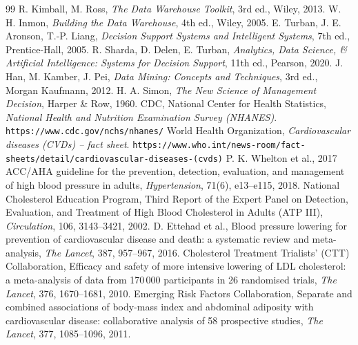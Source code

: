 \begin{thebibliography}{99}
 R. Kimball, M. Ross, \emph{The Data Warehouse Toolkit}, 3rd ed., Wiley, 2013.
 W. H. Inmon, \emph{Building the Data Warehouse}, 4th ed., Wiley, 2005.
 E. Turban, J. E. Aronson, T.-P. Liang, \emph{Decision Support Systems and Intelligent Systems}, 7th ed., Prentice-Hall, 2005.
 R. Sharda, D. Delen, E. Turban, \emph{Analytics, Data Science, \& Artificial Intelligence: Systems for Decision Support}, 11th ed., Pearson, 2020.
 J. Han, M. Kamber, J. Pei, \emph{Data Mining: Concepts and Techniques}, 3rd ed., Morgan Kaufmann, 2012.
 H. A. Simon, \emph{The New Science of Management Decision}, Harper \& Row, 1960.
 CDC, National Center for Health Statistics, \emph{National Health and Nutrition Examination Survey (NHANES)}. \texttt{https://www.cdc.gov/nchs/nhanes/}
 World Health Organization, \emph{Cardiovascular diseases (CVDs) -- fact sheet}. \texttt{https://www.who.int/news-room/fact-sheets/detail/cardiovascular-diseases-(cvds)}
 P. K. Whelton et al., 2017 ACC/AHA guideline for the prevention, detection, evaluation, and management of high blood pressure in adults, \emph{Hypertension}, 71(6), e13--e115, 2018.
 National Cholesterol Education Program, Third Report of the Expert Panel on Detection, Evaluation, and Treatment of High Blood Cholesterol in Adults (ATP III), \emph{Circulation}, 106, 3143--3421, 2002.
 D. Ettehad et al., Blood pressure lowering for prevention of cardiovascular disease and death: a systematic review and meta-analysis, \emph{The Lancet}, 387, 957--967, 2016.
 Cholesterol Treatment Trialists' (CTT) Collaboration, Efficacy and safety of more intensive lowering of LDL cholesterol: a meta-analysis of data from 170\,000 participants in 26 randomised trials, \emph{The Lancet}, 376, 1670--1681, 2010.
 Emerging Risk Factors Collaboration, Separate and combined associations of body-mass index and abdominal adiposity with cardiovascular disease: collaborative analysis of 58 prospective studies, \emph{The Lancet}, 377, 1085--1096, 2011.
\end{thebibliography}
